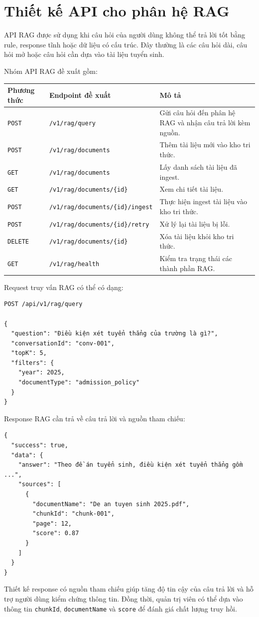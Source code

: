 \section{Thiết kế API cho phân hệ RAG}

API RAG được sử dụng khi câu hỏi của người dùng không thể trả lời tốt bằng rule, response tĩnh hoặc dữ liệu có cấu trúc. Đây thường là các câu hỏi dài, câu hỏi mở hoặc câu hỏi cần dựa vào tài liệu tuyển sinh.

Nhóm API RAG đề xuất gồm:

\begin{longtable}{|p{3cm}|p{5cm}|p{7cm}|}
\hline
\textbf{Phương thức} & \textbf{Endpoint đề xuất} & \textbf{Mô tả} \\
\hline
\texttt{POST} & \texttt{/v1/rag/query} & Gửi câu hỏi đến phân hệ RAG và nhận câu trả lời kèm nguồn. \\
\hline
\texttt{POST} & \texttt{/v1/rag/documents} & Thêm tài liệu mới vào kho tri thức. \\
\hline
\texttt{GET} & \texttt{/v1/rag/documents} & Lấy danh sách tài liệu đã ingest. \\
\hline
\texttt{GET} & \texttt{/v1/rag/documents/\{id\}} & Xem chi tiết tài liệu. \\
\hline
\texttt{POST} & \texttt{/v1/rag/documents/\{id\}/ingest} & Thực hiện ingest tài liệu vào kho tri thức. \\
\hline
\texttt{POST} & \texttt{/v1/rag/documents/\{id\}/retry} & Xử lý lại tài liệu bị lỗi. \\
\hline
\texttt{DELETE} & \texttt{/v1/rag/documents/\{id\}} & Xóa tài liệu khỏi kho tri thức. \\
\hline
\texttt{GET} & \texttt{/v1/rag/health} & Kiểm tra trạng thái các thành phần RAG. \\
\hline
\end{longtable}

Request truy vấn RAG có thể có dạng:

\begin{verbatim}
POST /api/v1/rag/query

{
  "question": "Điều kiện xét tuyển thẳng của trường là gì?",
  "conversationId": "conv-001",
  "topK": 5,
  "filters": {
    "year": 2025,
    "documentType": "admission_policy"
  }
}
\end{verbatim}

Response RAG cần trả về câu trả lời và nguồn tham chiếu:

\begin{verbatim}
{
  "success": true,
  "data": {
    "answer": "Theo đề án tuyển sinh, điều kiện xét tuyển thẳng gồm ...",
    "sources": [
      {
        "documentName": "De an tuyen sinh 2025.pdf",
        "chunkId": "chunk-001",
        "page": 12,
        "score": 0.87
      }
    ]
  }
}
\end{verbatim}

Thiết kế response có nguồn tham chiếu giúp tăng độ tin cậy của câu trả lời và hỗ trợ người dùng kiểm chứng thông tin. Đồng thời, quản trị viên có thể dựa vào thông tin \texttt{chunkId}, \texttt{documentName} và \texttt{score} để đánh giá chất lượng truy hồi.
